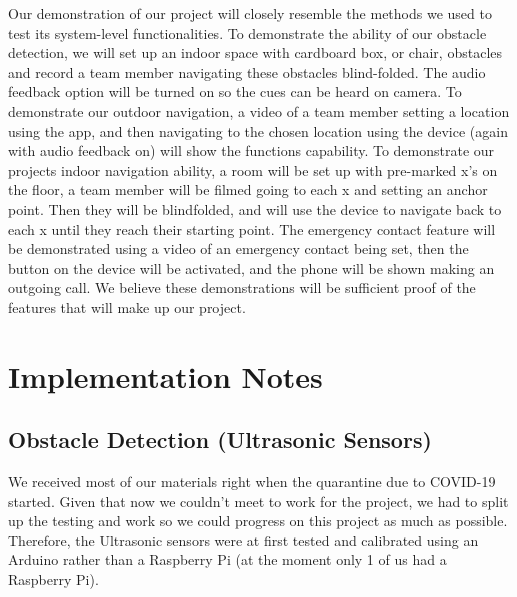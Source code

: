\documentclass[letterpaper,12pt]{article}
\begin{document}
Our demonstration of our project will closely resemble the methods we used to test its system-level functionalities. To demonstrate the ability of our obstacle detection, we will set up an indoor space with cardboard box, or chair, obstacles  and record a team member navigating these obstacles blind-folded. The audio feedback option will be turned on so the cues can be heard on camera. To demonstrate our outdoor navigation, a video of a team member setting a location using the app, and then navigating to the chosen location using the device (again with audio feedback on) will show the functions capability. To demonstrate our projects indoor navigation ability, a room will be set up with pre-marked x's on the floor, a team member will be filmed going to each x and setting an anchor point. Then they will be blindfolded, and will use the device to navigate back to each x until they reach their starting point. The emergency contact feature will be demonstrated using a video of an emergency contact being set, then the button on the device will be activated, and the phone will be shown making an outgoing call. We believe these demonstrations will be sufficient proof of the features that will make up our project. \par



\section{Implementation Notes}

\subsection{Obstacle Detection (Ultrasonic Sensors)}
We received most of our materials right when the quarantine due to COVID-19 started. Given that now we couldn't meet to work for the project, we had to split up the testing and work so we could progress on this project as much as possible. Therefore, the Ultrasonic sensors were at first tested and calibrated using an Arduino rather than a Raspberry Pi (at the moment only 1 of us had a Raspberry Pi). \par
\end{document}
